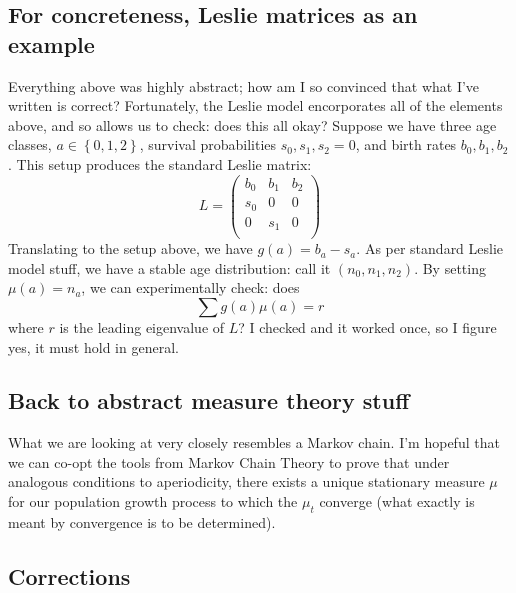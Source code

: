 \subsection{For concreteness, Leslie matrices as an example}
Everything above was highly abstract; how am I so convinced that what I've written is correct? Fortunately, the Leslie model 
encorporates all of the elements above, and so allows us to check: does this all okay? Suppose we have three age classes,
$a\in\left\{ 0, 1, 2 \right\}$, survival probabilities $s_0, s_1, s_2 = 0$, and birth rates $b_0, b_1, b_2$. This setup produces the
standard Leslie matrix:
$$ L = 
\begin{pmatrix}
    b_0 & b_1 & b_2 \\
    s_0 & 0 & 0 \\
    0 & s_1 & 0 \\
\end{pmatrix}
$$
Translating to the setup above, we have $g(a) = b_a - s_a$. As per standard Leslie model stuff, we have a stable age distribution:
call it $(n_0, n_1, n_2)$. By setting $\mu(a) = n_a$, we can experimentally check: does
$$ \sum g(a)\mu(a) = r$$
where $r$ is the leading eigenvalue of $L$? I checked and it worked once, so I figure yes, it must hold in general. 

\subsection{Back to abstract measure theory stuff}
What we are looking at very closely resembles a Markov chain. I'm hopeful that we can co-opt the tools from Markov Chain Theory to
prove that under analogous conditions to aperiodicity, there exists a unique stationary measure $\mu$ for our population growth
process to which the $\mu_t$ converge (what exactly is meant by convergence is to be determined).  
\subsection{Corrections}

